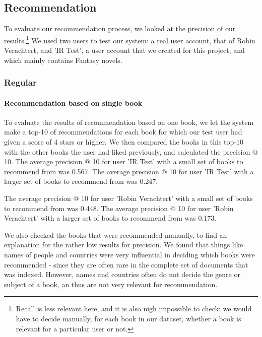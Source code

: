 \documentclass[10pt,a4paper]{paper}
\begin{document}
\subsection{Recommendation}

To evaluate our recommendation process, we looked at the precision of our results.\footnote{Recall is less relevant here, and it is also nigh impossible to check: we would have to decide manually, for each book in our dataset, whether a book is relevant for a particular user or not.} We used two users to test our system: a real user account, that of Robin Verachtert, and 'IR Test', a user account that we created for this project, and which mainly contains Fantasy novels.

\subsubsection{Regular}

\paragraph{Recommendation based on single book}
To evaluate the results of recommendation based on one book, we let the system make a top-10 of recommendations for each book for which our test user had given a score of 4 stars or higher. We then compared the books in this top-10 with the other books the user had liked previously, and calculated the precision @ 10.
The average precision @ 10 for user 'IR Test' with a small set of books to recommend from was 0.567. 
The average precision @ 10 for user 'IR Test' with a larger set of books to recommend from was 0.247.

The average precision @ 10 for user 'Robin Verachtert' with a small set of books to recommend from was 0.448. 
The average precision @ 10 for user 'Robin Verachtert' with a larger set of books to recommend from was 0.173.

We also checked the books that were recommended manually, to find an explanation for the rather low results for precision. We found that things like names of people and countries were very influential in deciding which books were recommended - since they are often rare in the complete set of documents that was indexed. However, names and countries often do not decide the genre or subject of a book, an thus are not very relevant for recommendation. 
\end{document}
